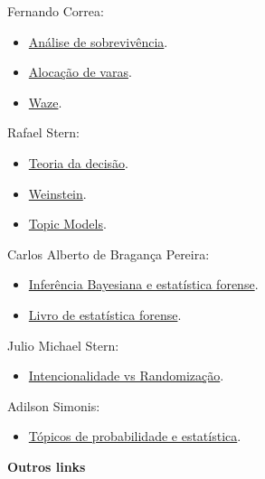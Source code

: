 \documentclass[]{book}
\providecommand{\tightlist}{%
  \setlength{\itemsep}{0pt}\setlength{\parskip}{0pt}}
\begin{document}
Fernando Correa:

\begin{itemize}
\tightlist
\item
  \href{https://github.com/abjur/curso/raw/master/pres/curso_tse.pdf}{Análise
  de sobrevivência}.
\item
  \href{https://github.com/abjur/alocTJSP}{Alocação de varas}.
\item
  \href{https://github.com/abjur/tjsp_app}{Waze}.
\end{itemize}

Rafael Stern:

\begin{itemize}
\tightlist
\item
  \href{https://github.com/abjur/curso/raw/master/pres/presentation-teoria-decisao.pdf}{Teoria
  da decisão}.
\item
  \href{https://github.com/abjur/curso/raw/master/pres/presentation_guidelines.pdf}{Weinstein}.
\item
  \href{https://github.com/abjur/curso/raw/master/pres/mining.pdf}{Topic
  Models}.
\end{itemize}

Carlos Alberto de Bragança Pereira:

\begin{itemize}
\tightlist
\item
  \href{https://github.com/abjur/curso/raw/master/pres/Aula_Brasilia.pdf}{Inferência
  Bayesiana e estatística forense}.
\item
  \href{https://github.com/abjur/curso/raw/master/pres/BAYESIAN_SCIENCE_FORENSIC_W.pdf}{Livro
  de estatística forense}.
\end{itemize}

Julio Michael Stern:

\begin{itemize}
\tightlist
\item
  \href{https://github.com/abjur/curso/raw/master/pres/ABJ161.pdf}{Intencionalidade
  vs Randomização}.
\end{itemize}

Adilson Simonis:

\begin{itemize}
\tightlist
\item
  \href{https://github.com/abjur/curso/raw/master/pres/conference_presentation(6).pdf}{Tópicos
  de probabilidade e estatística}.
\end{itemize}

\textbf{Outros links}
\end{document}
